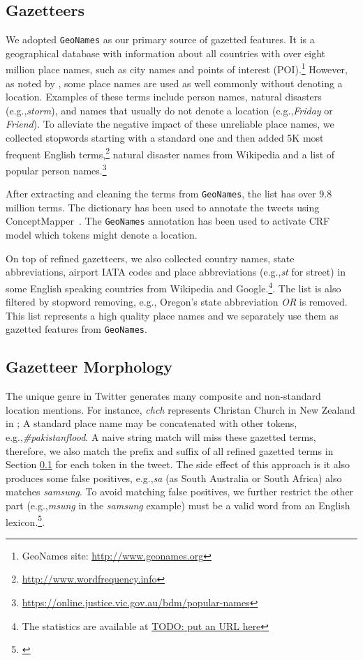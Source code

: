 \documentclass[11pt]{article}
\newcommand{\eg}{e.g.,\xspace}
\newcommand{\geoname}{\texttt{GeoNames}\xspace}
\newcommand{\myex}[1]{\textit{#1}}
\newcommand{\myurl}[1]{{\footnotesize\url{#1}}}
\newcommand{\secref}[2][]{Section#1 \ref{#2}}
\begin{document}
\subsection{Gazetteers}
\label{sec:gaze_feature}

We adopted \geoname as our primary source of gazetted features.
It is a geographical database with information about all countries with over eight million place names, such as city names and points of interest (POI).\footnote{GeoNames site: \myurl{http://www.geonames.org}} 
However, as noted by , some place names are used as well commonly without denoting a location.
Examples of these terms include person names, natural disasters (\eg \myex{storm}), and names that usually do not denote a location (\eg \myex{Friday} or \myex{Friend}).
To alleviate the negative impact of these unreliable place names, we collected stopwords starting with a standard one and then added 5K most frequent English terms,\footnote{\myurl{http://www.wordfrequency.info}} natural disaster names from Wikipedia and a list of popular person names.\footnote{\myurl{https://online.justice.vic.gov.au/bdm/popular-names}}

After extracting and cleaning the terms from \geoname, the list has over 9.8 million terms.
The dictionary has been used to annotate the tweets using ConceptMapper~\cite{tanenblatt2010conceptmapper}.
The \geoname annotation has been used to activate CRF model which tokens might denote a location.

On top of refined gazetteers, we also collected country names, state abbreviations, airport IATA codes and place abbreviations (\eg \myex{st} for street) in some English speaking countries from Wikipedia and Google.\footnote{The statistics are available at \myurl{TODO: put an URL here}}.
The list is also filtered by stopword removing, \eg Oregon's state abbreviation \myex{OR} is removed.
This list represents a high quality place names and we separately use them as gazetted features from \geoname.

\subsection{Gazetteer Morphology}
\label{sec:mor_feature}

The unique genre in Twitter generates many composite and non-standard location mentions.
For instance, \myex{chch} represents Christan Church in New Zealand in \myex{}; 
A standard place name may be concatenated with other tokens, \eg \myex{\#pakistanflood}.
A naive string match will miss these gazetted terms, therefore, we also match the prefix and suffix of all refined gazetted terms in \secref{sec:gaze_feature} for each token in the tweet.
The side effect of this approach is it also produces some false positives, \eg \myex{sa} (as South Australia or South Africa) also matches \myex{samsung}.
To avoid matching false positives, we further restrict the other part (\eg \myex{msung} in the \myex{samsung} example) must be a valid word from an English lexicon.\footnote{\myurl{}}.
\end{document}
